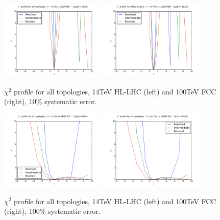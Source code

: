 \documentclass[11pt]{article}
\begin{document}
\begin{figure}[htbp]
\begin{center}
\includegraphics[width=0.45\textwidth]{plots/chi2_14TeV_sys0_1.pdf}
\includegraphics[width=0.45\textwidth]{plots/chi2_100TeV_sys0_1.pdf}
\caption{$\chi^2$ profile for all topologies, 14TeV HL-LHC (left) and 100TeV FCC (right), 10\% systematic error.}
\label{fig:chi2_0_1}
\end{center}
\end{figure}

\begin{figure}[htbp]
\begin{center}
\includegraphics[width=0.45\textwidth]{plots/chi2_14TeV_sys1.pdf}
\includegraphics[width=0.45\textwidth]{plots/chi2_100TeV_sys1.pdf}
\caption{$\chi^2$ profile for all topologies, 14TeV HL-LHC (left) and 100TeV FCC (right), 100\% systematic error.}
\label{fig:chi2_1}
\end{center}
\end{figure}

\end{document}
